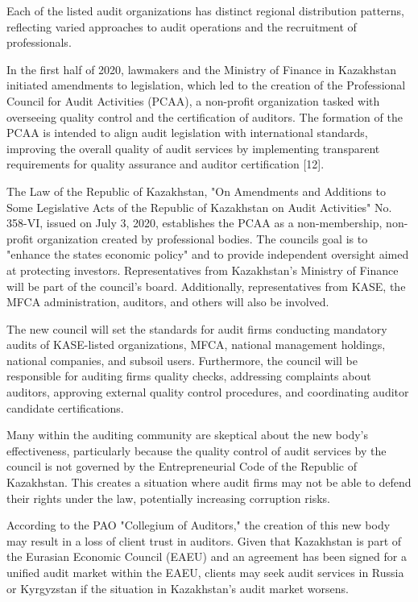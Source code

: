 Each of the listed audit organizations has distinct regional
distribution patterns, reflecting varied approaches to audit operations
and the recruitment of professionals.

In the first half of 2020, lawmakers and the Ministry of Finance in
Kazakhstan initiated amendments to legislation, which led to the
creation of the Professional Council for Audit Activities (PCAA), a
non-profit organization tasked with overseeing quality control and the
certification of auditors. The formation of the PCAA is intended to
align audit legislation with international standards, improving the
overall quality of audit services by implementing transparent
requirements for quality assurance and auditor certification {[}12{]}.

The Law of the Republic of Kazakhstan, "On Amendments and Additions to
Some Legislative Acts of the Republic of Kazakhstan on Audit Activities"
No. 358-VI, issued on July 3, 2020, establishes the PCAA as a
non-membership, non-profit organization created by professional bodies.
The council\textquotesingle s goal is to "enhance the
state\textquotesingle s economic policy" and to provide independent
oversight aimed at protecting investors. Representatives from
Kazakhstan's Ministry of Finance will be part of the council's board.
Additionally, representatives from KASE, the MFCA administration,
auditors, and others will also be involved.

The new council will set the standards for audit firms conducting
mandatory audits of KASE-listed organizations, MFCA, national management
holdings, national companies, and subsoil users. Furthermore, the
council will be responsible for auditing firms\textquotesingle{} quality
checks, addressing complaints about auditors, approving external quality
control procedures, and coordinating auditor candidate certifications.

Many within the auditing community are skeptical about the new body's
effectiveness, particularly because the quality control of audit
services by the council is not governed by the Entrepreneurial Code of
the Republic of Kazakhstan. This creates a situation where audit firms
may not be able to defend their rights under the law, potentially
increasing corruption risks.

According to the PAO "Collegium of Auditors," the creation of this new
body may result in a loss of client trust in auditors. Given that
Kazakhstan is part of the Eurasian Economic Council (EAEU) and an
agreement has been signed for a unified audit market within the EAEU,
clients may seek audit services in Russia or Kyrgyzstan if the situation
in Kazakhstan's audit market worsens.

